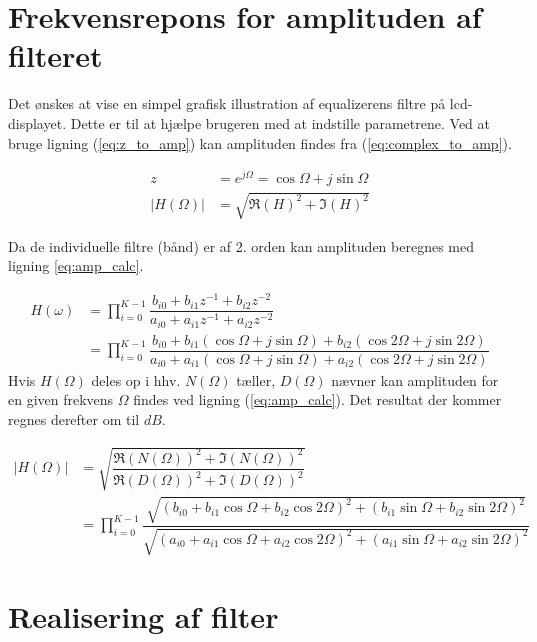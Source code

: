 \section{Frekvensrepons for amplituden af filteret }

Det ønskes at vise en simpel grafisk illustration af equalizerens filtre på lcd-displayet. 
Dette er til at hjælpe brugeren med at indstille parametrene.
Ved at bruge ligning (\ref{eq:z_to_amp}) kan amplituden findes fra (\ref{eq:complex_to_amp}).

\begin{align}
    z &= e^{j \Omega} = \cos{\Omega} + j \sin{\Omega}  
    \label{eq:z_to_amp}\\
    |H(\Omega)| &= \sqrt{ \Re{(H)}^2  + \Im{(H) }^2 }
    \label{eq:complex_to_amp}
\end{align}

Da de individuelle filtre (bånd) er af 2. orden kan amplituden beregnes med ligning \ref{eq:amp_calc}.

\begin{align}
    H(\omega) &= \prod\limits_{i=0}^{K-1} \dfrac{b_{i0} + b_{i1} z^{-1} + b_{i2} z^{-2}}{a_{i0} + a_{i1} z^{-1} + a_{i2} z^{-2}} \nonumber
    \\ &= \prod\limits_{i=0}^{K-1} \dfrac{b_{i0} + b_{i1} \left( \cos{\Omega} + j \sin{\Omega} \right)+b_{i2} \left( \cos{2\Omega} + j \sin{2\Omega} \right)}{a_{i0} + a_{i1} \left( \cos{\Omega} + j \sin{\Omega} \right)+a_{i2} \left( \cos{2\Omega} + j \sin{2\Omega} \right)} \label{eq:amp_rep}
\end{align}
Hvis $H(\Omega)$ deles op i hhv. $N(\Omega)$ tæller, $D(\Omega)$ nævner kan amplituden for en 
given frekvens $\Omega$ findes ved ligning (\ref{eq:amp_calc}).
Det resultat der kommer regnes derefter om til $dB$.

\begin{align}
    |H(\Omega)| &= \sqrt{ \dfrac{\Re{(N(\Omega))}^2 + \Im{(N(\Omega))}^2 }{\Re{(D(\Omega))}^2 + \Im{(D(\Omega))}^2 }} \nonumber	\\ 
     &= \prod\limits_{i=0}^{K-1} \dfrac{ \sqrt{\left( b_{i0} + b_{i1} \cos{\Omega} + b_{i2} \cos{2 \Omega} \right)^2 +  \left( b_{i1} \sin{\Omega} + b_{i2} \sin{2 \Omega} \right)^2 } }{ \sqrt{\left( a_{i0} + a_{i1} \cos{\Omega} + a_{i2} \cos{2 \Omega} \right)^2 + \left( a_{i1} \sin{\Omega} + a_{i2} \sin{2 \Omega} \right)^2} }
    \label{eq:amp_calc}
\end{align}


\section{Realisering af filter}

